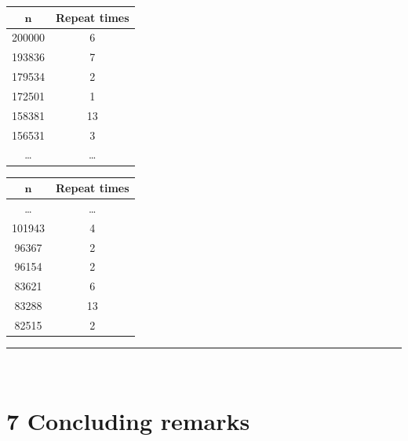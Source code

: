 \documentclass[12pt,english,]{article}
\let\origfigure\figure
\let\endorigfigure\endfigure
\renewenvironment{figure}[1][2] {
    \expandafter\origfigure\expandafter[H]
} {
    \endorigfigure
}
\begin{document}
\begin{figure}
\begin{minipage}{0.48\textwidth}
  \centering
  \begin{tabular}{|c|c|}
  \hline
  $\boldsymbol n$   & \textbf{Repeat times} \\ \hline
   200000  & 6            \\ \hline
   193836  & 7            \\ \hline
   179534  & 2            \\ \hline
   172501  & 1            \\ \hline
   158381  & 13           \\ \hline
   156531  & 3            \\ \hline
  \ldots   & \ldots       \\ \hline
  \end{tabular}
\end{minipage}
\begin{minipage}{0.48\textwidth}
  \centering
  \begin{tabular}{|c|c|}
  \hline
  $\boldsymbol n$   & \textbf{Repeat times} \\ \hline
  \ldots   & \ldots       \\ \hline
  101943   & 4            \\ \hline
   96367   & 2            \\ \hline
   96154   & 2            \\ \hline
   83621   & 6            \\ \hline
   83288   & 13           \\ \hline
   82515   & 2            \\ \hline
  \end{tabular}
\end{minipage}
\caption[Caption]{Given an input of $200\,000$ points generated in a grid. This is a portion of the data about the number of times the algorithm \textsc{SepAnn$(S,n,d,\mu,c)$} repeats.}
\label{fig:data_non_E}
\end{figure}

\hrule

~

\medskip

\hypertarget{section7}{%
\section{\texorpdfstring{7 \enspace Concluding
remarks}{7 Concluding remarks}}\label{section7}}
\end{document}
